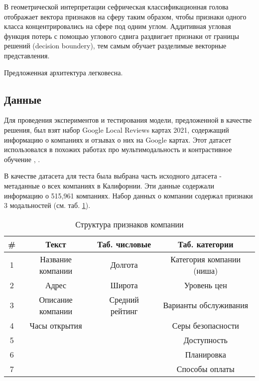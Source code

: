 \documentclass{article}
\begin{document}
В геометрической интерпретации сефрическая классификационная голова отображает вектора признаков на сферу таким образом, чтобы признаки одного класса концентрировались на сфере под одним углом. Аддитивная угловая функция потерь с помощью углового сдвига раздвигает признаки от границы решений (decision boundery), тем самым обучает разделимые векторные представления. 

\par Предложенная архитектура легковесна.

\subsection{Данные}
Для проведения экспериментов и тестирования модели, предложенной в качестве решения, был взят набор Google Local Reviews картах 2021, содержащий информацию о компаниях и отзывах о них на Google картах. Этот датасет использовался в похожих работах про мультимодальность и контрастивное обучение \cite{li2022uctopic}, \cite{yan2023personalized}.
\par  В качестве датасета для теста была выбрана часть исходного датасета - метаданные о всех компаниях в Калифорнии. Эти данные содержали информацию о 515,961 компаниях. Набор данных о компании содержал признаки 3 модальностей (см. таб. \ref{tab:company_features}).

\begin{table}
    \centering
    \begin{tabular}{|c|c|c|c|} \hline 
         \rowcolor{№} \textbf{#} & \textbf{Текст} & \textbf{Таб. числовые} & \textbf{Таб. категории} \\ \hline 
         1 & Название компании & Долгота & Категория компании (ниша) \\ \hline 
         2 & Адрес & Широта & Уровень цен \\ \hline 
         3 & Описание компании & Средний рейтинг & Варианты обслуживания \\ \hline 
         4 & Часы открытия &  & Серы безопасности \\ \hline 
         5 &  &  & Доступность \\ \hline 
         6 &  &  & Планировка \\ \hline 
         7 &  &  & Способы оплаты \\ \hline
    \end{tabular}
    \caption{Структура признаков компании}
    \label{tab:company_features}
\end{table}
\end{document}
